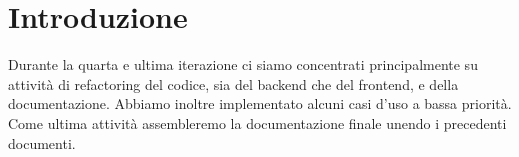 \section{Introduzione}
Durante la quarta e ultima iterazione ci siamo concentrati principalmente su attività di refactoring del codice, sia del backend che del frontend, e della documentazione. Abbiamo inoltre implementato alcuni casi d'uso a bassa priorità. Come ultima attività assembleremo la documentazione finale unendo i precedenti documenti.